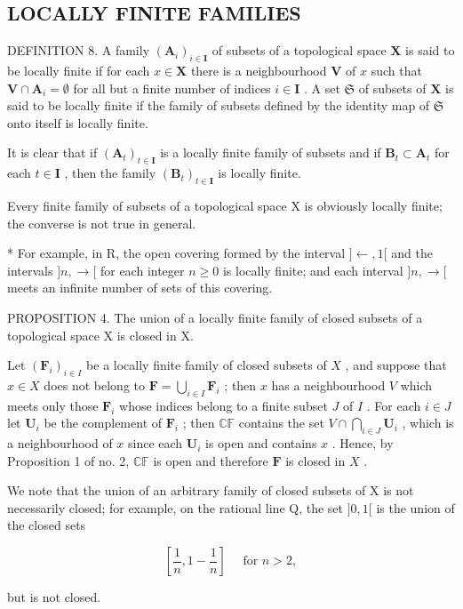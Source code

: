 \subsection{LOCALLY FINITE FAMILIES}

DEFINITION 8. A family \((\mathbf{A}_{i})_{i\in \mathbf{I}}\) of subsets of a topological space \(\mathbf{X}\) is said to be locally finite if for each \(x\in \mathbf{X}\) there is a neighbourhood \(\mathbf{V}\) of \(x\) such that \(\mathbf{V}\cap \mathbf{A}_i = \emptyset\) for all but a finite number of indices \(i\in \mathbf{I}\) . A set \(\mathfrak{S}\) of subsets of \(\mathbf{X}\) is said to be locally finite if the family of subsets defined by the identity map of \(\mathfrak{S}\) onto itself is locally finite.

It is clear that if \((\mathbf{A}_t)_{t \in \mathbf{I}}\) is a locally finite family of subsets and if \(\mathbf{B}_t \subset \mathbf{A}_t\) for each \(t \in \mathbf{I}\) , then the family \((\mathbf{B}_t)_{t \in \mathbf{I}}\) is locally finite.

Every finite family of subsets of a topological space X is obviously locally finite; the converse is not true in general.

* For example, in R, the open covering formed by the interval \(]\leftarrow, 1[\) and the intervals \(]n, \rightarrow[\) for each integer \(n\geqslant0\) is locally finite; and each interval \(]n, \rightarrow[\) meets an infinite number of sets of this covering.

PROPOSITION 4. The union of a locally finite family of closed subsets of a topological space X is closed in X.

Let \((\mathbf{F}_i)_{i\in I}\) be a locally finite family of closed subsets of \(X\) , and suppose that \(x\in X\) does not belong to \(\mathbf{F} = \bigcup_{i\in I}\mathbf{F}_i\) ; then \(x\) has a neighbourhood \(V\) which meets only those \(\mathbf{F}_i\) whose indices belong to a finite subset \(J\) of \(I\) . For each \(i\in J\) let \(\mathbf{U}_i\) be the complement of \(\mathbf{F}_i\) ; then \(\mathbb{CF}\) contains the set \(V\cap \bigcap_{i\in J}\mathbf{U}_i\) , which is a neighbourhood of \(x\) since each \(\mathbf{U}_i\) is open and contains \(x\) . Hence, by Proposition 1 of no. 2, \(\mathbb{CF}\) is open and therefore \(\mathbf{F}\) is closed in \(X\) .

We note that the union of an arbitrary family of closed subsets of X is not necessarily closed; for example, on the rational line Q, the set \(]0, 1[\) is the union of the closed sets

\[
\left[ \frac {1}{n}, 1 - \frac {1}{n} \right] \quad \text { for } n > 2,
\]

but is not closed.

